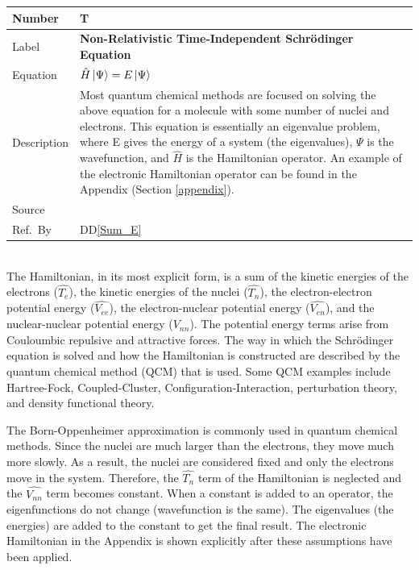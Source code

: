 \documentclass[12pt]{article}
\newcommand{\colAwidth}{0.13\textwidth}
\newcommand{\colBwidth}{0.82\textwidth}
\newcommand{\ddref}[1]{DD\ref{#1}}
\newcounter{theorynum} %
\begin{document}
\noindent
\begin{minipage}{\textwidth}
	\renewcommand*{\arraystretch}{1.5}
	\begin{tabular}{| p{\colAwidth} | p{\colBwidth}|}
		\hline
		\rowcolor[gray]{0.9}
		Number& T{theorynum}\thetheorynum \label{T_SE}\\
		\hline
		Label&\bf Non-Relativistic Time-Independent Schr\"{o}dinger Equation \\
		\hline
		Equation&  $\hat{H}\ket{\Psi} = E\ket{\Psi}$ \\
		\hline
		Description & 
		Most quantum chemical methods are focused on solving the above equation 
		for a molecule with some number of nuclei and electrons. This equation 
		is essentially an eigenvalue problem, where E gives the energy of a 
		system (the eigenvalues), $\Psi$ is the wavefunction, and $\hat{H}$ is 
		the Hamiltonian operator. An example of the electronic Hamiltonian 
		operator can be found in the Appendix (Section \ref{appendix}).\\
		\hline
		Source & \cite{szabo-ostlund} \\
		\hline
		Ref.\ By & \ddref{Sum_E}\\
		\hline
	\end{tabular}
\end{minipage}\\

The Hamiltonian, in its most explicit form, is a sum of the kinetic energies of 
the electrons ($\hat{T_e}$), the kinetic energies of the nuclei ($\hat{T_n}$), 
the electron-electron potential energy ($\hat{V_{ee}}$), the electron-nuclear 
potential energy ($\hat{V_{en}}$), and the nuclear-nuclear potential energy 
($\hat{V_{nn}}$). The potential energy terms arise from Couloumbic repulsive 
and attractive forces. The way in which the Schr\"{o}dinger equation is solved 
and how the Hamiltonian is constructed are described by the quantum chemical 
method (QCM) that is used. Some QCM examples include Hartree-Fock, 
Coupled-Cluster, Configuration-Interaction, perturbation theory, and density 
functional theory.

The Born-Oppenheimer approximation is commonly used in quantum chemical 
methods. Since the nuclei are much larger than the electrons, they move much 
more slowly. As a result, the nuclei are considered fixed and only the 
electrons move in the system. Therefore, the $\hat{T_n}$ term of the 
Hamiltonian is neglected and the $\hat{V_{nn}}$ term becomes constant. When a 
constant is added to an operator, the eigenfunctions do not change 
(wavefunction is the same). The eigenvalues (the energies) are added to the 
constant to get the final result. The electronic Hamiltonian in the 
Appendix is shown explicitly after these assumptions have been applied.
\end{document}

